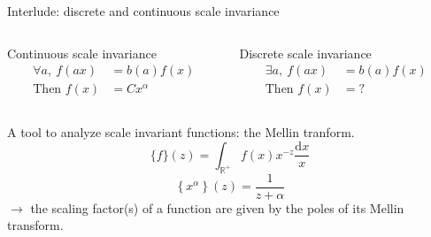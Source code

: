 \documentclass[xcolor=x11names,compress,professionalfonts]{beamer}
\renewcommand{\(}{\begin{columns}}
\renewcommand{\)}{\end{columns}}
\newcommand{\<}[1]{\begin{column}{#1}}
\renewcommand{\>}{\end{column}}
\renewcommand{\d}[1]{\mathrm{d}#1}
\begin{document}
\begin{frame}{Interlude: discrete and continuous scale invariance}
    \begin{columns}
\newcommand{\s}{.2}
  \begin{column}{5cm}
  	\begin{block}{Continuous scale invariance}
  	\begin{align*}
		\forall a,~ f(ax) &= b(a) f(x) \\
		\text{Then } f(x) &= C x^\alpha
	\end{align*}
  	\end{block}
  \end{column}

  \begin{column}{5cm}
  	\begin{block}{Discrete scale invariance}
  	\begin{align*}
		\exists a,~ f(ax) &= b(a) f(x) \\
		\text{Then } f(x) &= ?
	\end{align*}
  	\end{block}
  \end{column}
\end{columns}
A tool to analyze scale invariant functions: the Mellin tranform.
\[ \{ f \}(z) = \int_{\mathbb{R}^+} f(x) x^{-z} \frac{\d{x}}{x} \]
\[ \left\{ x^\alpha \right\}(z) = \frac{1}{z + \alpha} \]
$\rightarrow$ the scaling factor(s) of a function are given by the poles of its Mellin transform.
\end{frame}
\end{document}
